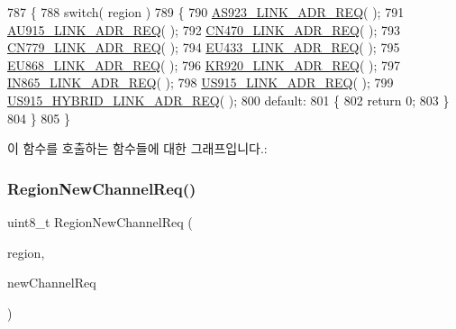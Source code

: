 \begin{DoxyCode}
787 \{
788     \textcolor{keywordflow}{switch}( region )
789     \{
790         \mbox{\hyperlink{_region_8c_ae246f17ed0d848225dff693b0ba064f5}{AS923\_LINK\_ADR\_REQ}}( );
791         \mbox{\hyperlink{_region_8c_a43fe119319d6a67a8ae12769fb1fb5d0}{AU915\_LINK\_ADR\_REQ}}( );
792         \mbox{\hyperlink{_region_8c_ac3054ecc7ae17b2a9df9ab004683bd42}{CN470\_LINK\_ADR\_REQ}}( );
793         \mbox{\hyperlink{_region_8c_ace3dcde7b7f960ab453c7f02cac61572}{CN779\_LINK\_ADR\_REQ}}( );
794         \mbox{\hyperlink{_region_8c_a4cdd9a5b865dd2305a88fee14aca650d}{EU433\_LINK\_ADR\_REQ}}( );
795         \mbox{\hyperlink{_region_8c_ad64f68873a16666af5753ddc751668ad}{EU868\_LINK\_ADR\_REQ}}( );
796         \mbox{\hyperlink{_region_8c_a1fe1179e0100d48e6be94eef952273d7}{KR920\_LINK\_ADR\_REQ}}( );
797         \mbox{\hyperlink{_region_8c_aca3c99a33e4e5a3cdb1c12285f1f9c71}{IN865\_LINK\_ADR\_REQ}}( );
798         \mbox{\hyperlink{_region_8c_a68fe3a18751e225d832d2d9f940babd6}{US915\_LINK\_ADR\_REQ}}( );
799         \mbox{\hyperlink{_region_8c_a0cf03e1a6cf240b24a33a57f2257277e}{US915\_HYBRID\_LINK\_ADR\_REQ}}( );
800         \textcolor{keywordflow}{default}:
801         \{
802             \textcolor{keywordflow}{return} 0;
803         \}
804     \}
805 \}
\end{DoxyCode}
이 함수를 호출하는 함수들에 대한 그래프입니다.\+:
\mbox{\label{group___r_e_g_i_o_n_gadca654538335b4395c8d54642b83e2d4}} 
\subsubsection{\texorpdfstring{Region\+New\+Channel\+Req()}{RegionNewChannelReq()}}
{\footnotesize\ttfamily uint8\+\_\+t Region\+New\+Channel\+Req (\begin{DoxyParamCaption}\item[{\mbox{\hyperlink{group___l_o_r_a_m_a_c_ga80c48efda9ae02e14b58160d34a798dd}{Lo\+Ra\+Mac\+Region\+\_\+t}}}]{region,  }\item[{\mbox{\hyperlink{group___r_e_g_i_o_n_gae2abcdb6dbb843c9faf5fd3009eca9d6}{New\+Channel\+Req\+Params\+\_\+t}} $\ast$}]{new\+Channel\+Req }\end{DoxyParamCaption})}



